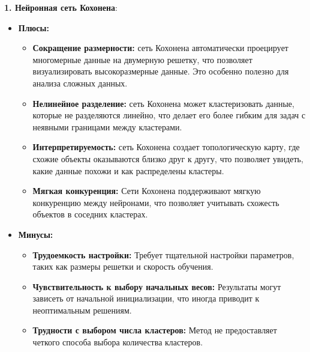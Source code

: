 \textbf{1. Нейронная сеть Кохонена}:
\begin{itemize}
    \item \textbf{Плюсы:}
          \begin{itemize}
              \item \textbf{Сокращение размерности:} сеть Кохонена автоматически проецирует многомерные данные на двумерную решетку, что позволяет визуализировать высокоразмерные данные. Это особенно полезно для анализа сложных данных.
              \item \textbf{Нелинейное разделение:} сеть Кохонена может кластеризовать данные, которые не разделяются линейно, что делает его более гибким для задач с неявными границами между кластерами.
              \item \textbf{Интерпретируемость:} сеть Кохонена создает топологическую карту, где схожие объекты оказываются близко друг к другу, что позволяет увидеть, какие данные похожи и как распределены кластеры.
              \item \textbf{Мягкая конкуренция:} Сети Кохонена поддерживают мягкую конкуренцию между нейронами, что позволяет учитывать схожесть объектов в соседних кластерах.
          \end{itemize}
    \item \textbf{Минусы:}
          \begin{itemize}
              \item \textbf{Трудоемкость настройки:} Требует тщательной настройки параметров, таких как размеры решетки и скорость обучения.
              \item \textbf{Чувствительность к выбору начальных весов:} Результаты могут зависеть от начальной инициализации, что иногда приводит к неоптимальным решениям.
              \item \textbf{Трудности с выбором числа кластеров:} Метод не предоставляет четкого способа выбора количества кластеров.
          \end{itemize}
\end{itemize}

